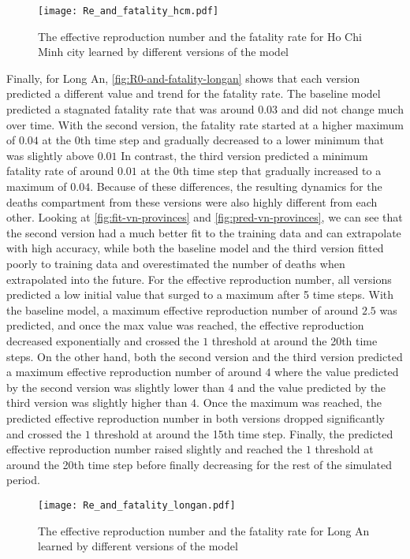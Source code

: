 \begin{figure}[!htb]
    \centering
    \texttt{[image: Re\_and\_fatality\_hcm.pdf]}
    \caption{The effective reproduction number and the fatality rate for Ho Chi Minh city learned by different versions of the model}
    \label{fig:R0-and-fatality-hochiminh}
\end{figure}

Finally, for Long An, \autoref{fig:R0-and-fatality-longan} shows that each version predicted a different value and trend for the fatality rate.
The baseline model predicted a stagnated fatality rate that was around $0.03$ and did not change much over time.
With the second version, the fatality rate started at a higher maximum of $0.04$ at the 0th time step and gradually decreased to a lower minimum that was slightly above $0.01$
In contrast, the third version predicted a minimum fatality rate of around $0.01$ at the 0th time step that gradually increased to a maximum of $0.04$.
Because of these differences, the resulting dynamics for the deaths compartment from these versions were also highly different from each other.
Looking at \autoref{fig:fit-vn-provinces} and \autoref{fig:pred-vn-provinces}, we can see that the second version had a much better fit to the training data and can extrapolate with high accuracy, while both the baseline model and the third version fitted poorly to training data and overestimated the number of deaths when extrapolated into the future.
For the effective reproduction number, all versions predicted a low initial value that surged to a maximum after 5 time steps.
With the baseline model, a maximum effective reproduction number of around $2.5$ was predicted, and once the max value was reached, the effective reproduction decreased exponentially and crossed the $1$ threshold at around the 20th time steps.
On the other hand, both the second version and the third version predicted a maximum effective reproduction number of around $4$ where the value predicted by the second version was slightly lower than $4$ and the value predicted by the third version was slightly higher than $4$.
Once the maximum was reached, the predicted effective reproduction number in both versions dropped significantly and crossed the $1$ threshold at around the 15th time step.
Finally, the predicted effective reproduction number raised slightly and reached the $1$ threshold at around the 20th time step before finally decreasing for the rest of the simulated period.

\begin{figure}[!htb]
    \centering
    \texttt{[image: Re\_and\_fatality\_longan.pdf]}
    \caption{The effective reproduction number and the fatality rate for Long An learned by different versions of the model}
    \label{fig:R0-and-fatality-longan}
\end{figure}

